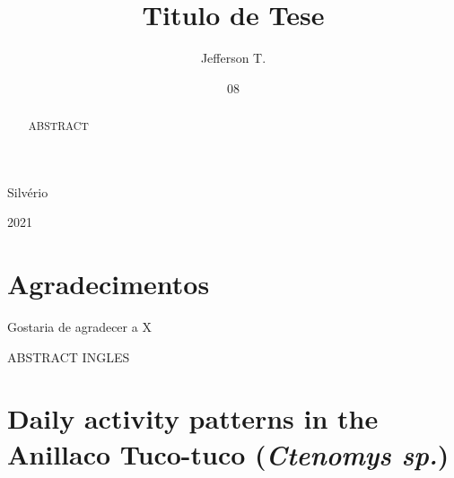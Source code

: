 \documentclass[english,msc,numbers,hidelinks]{coppe}
\begin{document}
  \title{Titulo de Tese}
    \author{Jefferson T.}{Silvério}
  

  \date{08}{2021}
    
  \maketitle

  \frontmatter
  
  \dedication{A alguém cujo valor é digno desta dedicatória.}
    \chapter*{Agradecimentos}
  Gostaria de agradecer a X
  
  \begin{abstract}
  ABSTRACT
  \end{abstract}
  \pagebreak
  \begin{foreignabstract}
  ABSTRACT INGLES
  \end{foreignabstract}
  \tableofcontents
  
    \listoffigures
  
    \listoftables
  
  \printlosymbols
  \printloabbreviations

  \mainmatter
  \hypertarget{daily-activity-patterns-in-the-anillaco-tuco-tuco-ctenomys-sp.}{%
  \chapter{\texorpdfstring{Daily activity patterns in the Anillaco Tuco-tuco (\emph{Ctenomys sp.})}{Daily activity patterns in the Anillaco Tuco-tuco (Ctenomys sp.)}}\label{daily-activity-patterns-in-the-anillaco-tuco-tuco-ctenomys-sp.}}
\end{document}
